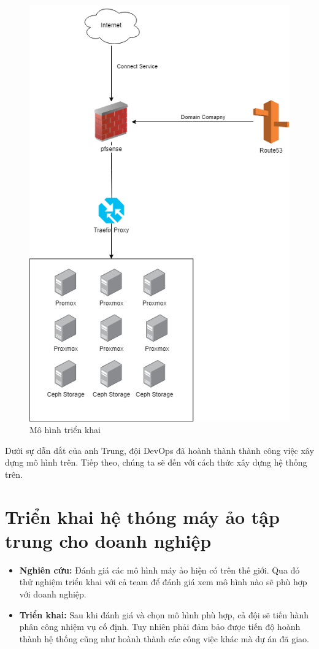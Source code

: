 \documentclass[12pt,a4paper]{report}
\begin{document}
		\begin{figure}
			\centering
			\includegraphics[width=0.75\linewidth]{"Pics/diagram-2"}
			\caption{Mô hình triển khai}
			\label{fig:logo-hvMo_hinh_cong_ty}
		\end{figure}
	
		\hspace{1.0cm}{Đây là mô hình được xây dựng bởi giám đốc DevOps, anh Nguyễn Thành Trung, người dẫn dắt DevOps team thực hiện các dự án trong và ngoài cho công ty. Mô hình này được xây dựng với tiêu chí rằng luôn luôn sẵn sàng cung cấp tài nguyên cho những dự án đã và đang được thực hiện bởi các đội trong công ty.}
		
		\hspace{0.3cm} {Dưới sự dẫn dắt của anh Trung, đội DevOps đã hoành thành thành công việc xây dựng mô hình trên. Tiếp theo, chúng ta sẽ đến với cách thức xây dựng hệ thống trên.}
		
	\section{Triển khai hệ thóng máy ảo tập trung cho doanh nghiệp}
		\hspace{1.0cm}{Để đảm bảo việc triển khai hệ thống chính xác, nhanh chóng, em đã được giao các nhiệm vụ sau:}
			\begin{itemize}
				\item {\textbf{Nghiên cứu: } Đánh giá các mô hình máy ảo hiện có trên thế giới. Qua đó thử nghiệm triển khai với cả team để đánh giá xem mô hình nào sẽ phù hợp với doanh nghiệp.}
				\item {\textbf{Triển khai: } Sau khi đánh giá và chọn mô hình phù hợp, cả đội sẽ tiến hành phân công nhiệm vụ cố định. Tuy nhiên phải đảm bảo được tiến độ hoành thành hệ thống cũng như hoành thành các công việc khác mà dự án đã giao.}
			\end{itemize}
\end{document}
